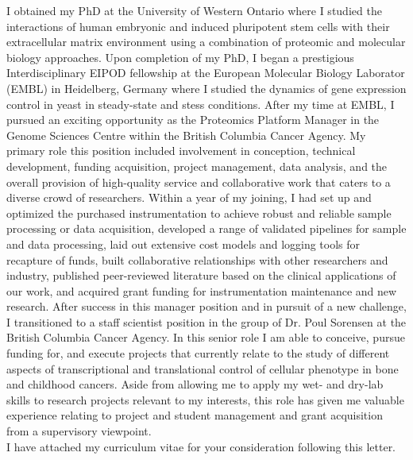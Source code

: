 \documentclass[11pt]{article}
\begin{document}
I obtained my PhD at the University of Western Ontario where I studied the interactions of human embryonic and induced pluripotent stem cells with their extracellular matrix environment using a combination of proteomic and molecular biology approaches. Upon completion of my PhD, I began a prestigious Interdisciplinary EIPOD fellowship at the European Molecular Biology Laborator (EMBL) in Heidelberg, Germany where I studied the dynamics of gene expression control in yeast in steady-state and stess conditions. After my time at EMBL, I pursued an exciting opportunity as the Proteomics Platform Manager in the Genome Sciences Centre within the British Columbia Cancer Agency. My primary role this position included involvement in conception, technical development, funding acquisition, project management, data analysis, and the overall provision of high-quality service and collaborative work that caters to a diverse crowd of researchers. Within a year of my joining, I had set up and optimized the purchased instrumentation to achieve robust and reliable sample processing or data acquisition, developed a range of validated pipelines for sample and data processing, laid out extensive cost models and logging tools for recapture of funds, built collaborative relationships with other researchers and industry, published peer-reviewed literature based on the clinical applications of our work, and acquired grant funding for instrumentation maintenance and new research. After success in this manager position and in pursuit of a new challenge, I transitioned to a staff scientist position in the group of Dr. Poul Sorensen at the British Columbia Cancer Agency. In this senior role I am able to conceive, pursue funding for, and execute projects that currently relate to the study of different aspects of transcriptional and translational control of cellular phenotype in bone and childhood cancers. Aside from allowing me to apply my wet- and dry-lab skills to research projects relevant to my interests, this role has given me valuable experience relating to project and student management and grant acquisition from a supervisory viewpoint.\\

\noindent
I have attached my curriculum vitae for your consideration following this letter.
\end{document}
